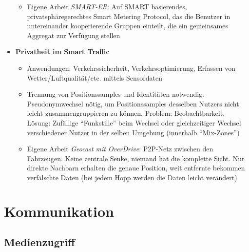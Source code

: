 \begin{itemize}
\begin{itemize}
\begin{itemize}
		\end{itemize}
		\item Eigene Arbeit \textit{SMART-ER}: Auf SMART basierendes, privatsphäregerechtes Smart Metering Protocol, das die Benutzer in untereinander kooperierende Gruppen einteilt, die ein gemeinsames Aggregat zur Verfügung stellen
	\end{itemize}
	\item \textbf{Privatheit im Smart Traffic}
	\begin{itemize}
		\item Anwendungen: Verkehrssicherheit, Verkehrsoptimierung, Erfassen von Wetter/Luftqualität/etc. mittels Sensordaten
		\item Trennung von Positionssamples und Identitäten notwendig. Pseudonymwechsel nötig, um Positionssamples desselben Nutzers nicht leicht zusammengruppieren zu können. Problem: Beobachtbarkeit. Lösung: Zufällige "`Funkstille"' beim Wechsel oder gleichzeitiger Wechsel verschiedener Nutzer in der selben Umgebung (innerhalb "`Mix-Zones"')
		\item Eigene Arbeit \textit{Geocast mit OverDrive}: P2P-Netz zwischen den Fahrzeugen. Keine zentrale Senke, niemand hat die komplette Sicht. Nur direkte Nachbarn erhalten die genaue Position, weit entfernte bekommen verfälschte Daten (bei jedem Hopp werden die Daten leicht verändert)
	\end{itemize}
\end{itemize}



\section{Kommunikation}

\subsection{Medienzugriff}

